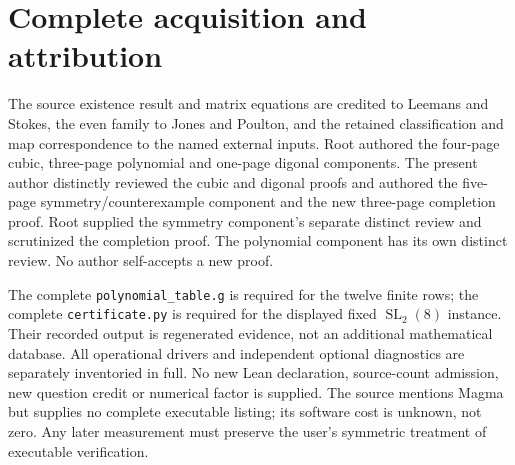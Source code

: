 \documentclass[11pt,a4paper]{article}
\begin{document}
\section*{Complete acquisition and attribution}
The source existence result and matrix equations are credited to
Leemans and Stokes, the even family to Jones and Poulton, and the retained
classification and map correspondence to the named external inputs.
Root authored the four-page cubic, three-page polynomial and one-page
digonal components. The present author distinctly reviewed the cubic
and digonal proofs and authored the five-page symmetry/counterexample component and the new
three-page completion proof. Root supplied the symmetry component's separate distinct review and scrutinized the completion proof. The polynomial
component has its own distinct review. No author self-accepts a new proof.

The complete \texttt{polynomial\_table.g} is required for the twelve
finite rows; the complete \texttt{certificate.py} is required for the
displayed fixed $\operatorname{SL}_2(8)$ instance. Their recorded output
is regenerated evidence, not an additional mathematical database.
All operational drivers and independent optional diagnostics are
separately inventoried in full. No new Lean declaration, source-count
admission, new question credit or numerical factor is supplied. The source
mentions Magma but supplies no complete executable listing; its software
cost is unknown, not zero. Any later measurement must preserve the
user's symmetric treatment of executable verification.
\end{document}
